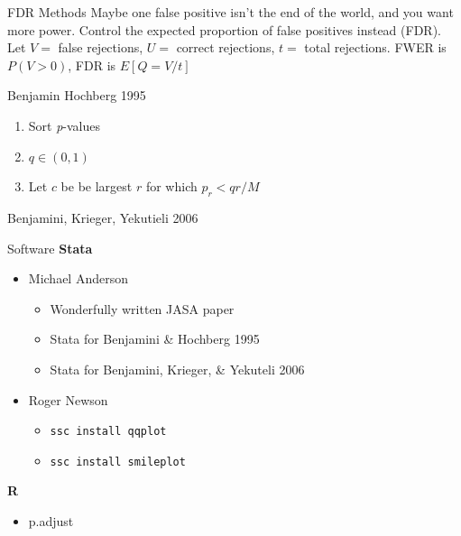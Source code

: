 \documentclass{beamer}
\begin{document}
\begin{frame}{FDR Methods}
Maybe one false positive isn't the end of the world, and you want more power. Control the expected proportion of false positives instead (FDR).
\vskip0.1in
Let $V=$ false rejections, $U=$ correct rejections, $t=$ total rejections.
\vskip0.1in
FWER is $P(V>0)$, FDR is $E[Q=V/t]$
\end{frame}

\begin{frame}{Benjamin Hochberg 1995}
\begin{enumerate}
\item Sort \textit{p}-values
\item $q \in (0,1)$
\item Let $c$ be be largest $r$ for which $p_r<qr/M$

\end{enumerate}
\end{frame}

\begin{frame}{Benjamini, Krieger, Yekutieli 2006}
\end{frame}


\begin{frame}{Software}
\textbf{Stata}
\begin{itemize}
\item Michael Anderson
\begin{itemize}
\item Wonderfully written JASA paper \href{https://are.berkeley.edu/~mlanderson/pdf/Anderson\%202008a.pdf}{}
\item Stata for Benjamini \& Hochberg 1995 \href{http://are.berkeley.edu/~mlanderson/downloads/fdr_qvalues.do.zip}{}
\item Stata for Benjamini, Krieger, \& Yekuteli 2006 \href{http://are.berkeley.edu/~mlanderson/downloads/fdr\_sharpened\_qvalues.do.zip}{}
\end{itemize}
\item Roger Newson
\begin{itemize}
\item \texttt{ssc install qqplot} \href{http://www.stata-journal.com/sjpdf.html?articlenum=st0209}{}
\item \texttt{ssc install smileplot} \href{http://www.stata-journal.com/sjpdf.html?articlenum=st0035}{}
\end{itemize}
\end{itemize}
\textbf{R}
\begin{itemize}
\item p.adjust \href{https://www.rdocumentation.org/packages/stats/versions/3.4.3/topics/p.adjust}{}
\end{itemize}
\end{frame}
\end{document}
